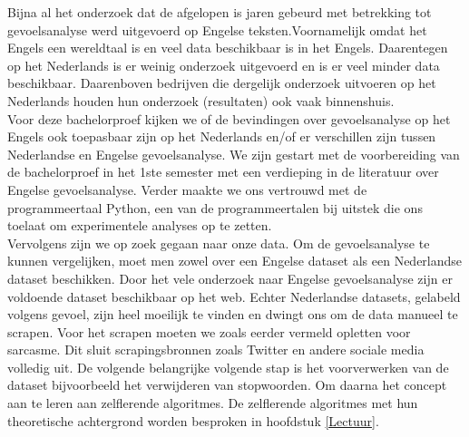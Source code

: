 Bijna al het onderzoek dat de afgelopen is jaren gebeurd met betrekking tot gevoelsanalyse werd uitgevoerd op Engelse teksten.Voornamelijk omdat het Engels een wereldtaal is en veel data beschikbaar is in het Engels. Daarentegen op het Nederlands is er weinig onderzoek uitgevoerd en is er veel minder data beschikbaar. Daarenboven bedrijven die dergelijk onderzoek uitvoeren op het Nederlands houden hun onderzoek (resultaten) ook vaak binnenshuis.
\\
Voor deze bachelorproef kijken we of de bevindingen over gevoelsanalyse op het Engels ook toepasbaar zijn op het Nederlands en/of er verschillen zijn tussen Nederlandse en Engelse gevoelsanalyse.
We zijn gestart met de voorbereiding van de bachelorproef in het 1ste semester met een verdieping in de literatuur over Engelse gevoelsanalyse. Verder maakte we ons vertrouwd met de programmeertaal Python, een van de programmeertalen bij uitstek die ons toelaat om experimentele analyses op te zetten.\\
Vervolgens zijn we op zoek gegaan naar onze data. Om de gevoelsanalyse te kunnen vergelijken, moet men zowel over een Engelse dataset als een Nederlandse dataset beschikken. Door het vele onderzoek naar Engelse gevoelsanalyse zijn er voldoende dataset beschikbaar op het web. Echter Nederlandse datasets, gelabeld volgens gevoel, zijn heel moeilijk te vinden en dwingt ons om de data manueel te scrapen. Voor het scrapen moeten we zoals eerder vermeld opletten voor sarcasme. Dit sluit scrapingsbronnen zoals Twitter en andere sociale media volledig uit. De volgende belangrijke volgende stap is het voorverwerken van de dataset bijvoorbeeld het verwijderen van stopwoorden. Om daarna het concept aan te leren aan zelflerende algoritmes. De zelflerende algoritmes met hun theoretische achtergrond worden besproken in hoofdstuk \ref{Lectuur}.\\


